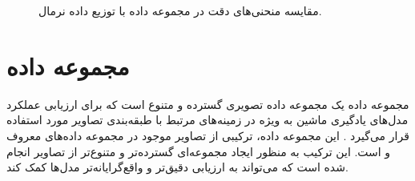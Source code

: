 \begin{figure}[t!]
	\centering
	\hspace{0.8mm}
	\caption{
		مقایسه منحنی‌های دقت در مجموعه داده
		با توزیع داده نرمال.
	}
	\label{result_cifar10_normal}
\end{figure}




\section{
	مجموعه داده
}




مجموعه داده
یک مجموعه داده تصویری گسترده و متنوع است که برای ارزیابی عملکرد مدل‌های یادگیری ماشین به ویژه در زمینه‌های مرتبط با طبقه‌بندی تصاویر مورد استفاده قرار می‌گیرد
\cite{darlow2018cinic}.
این مجموعه داده، ترکیبی از تصاویر موجود در مجموعه‌ داده‌های معروف
و
است. این ترکیب به منظور ایجاد مجموعه‌ای گسترده‌تر و متنوع‌تر از تصاویر انجام شده است که می‌تواند به ارزیابی دقیق‌تر و واقع‌گرایانه‌تر مدل‌ها کمک کند.

